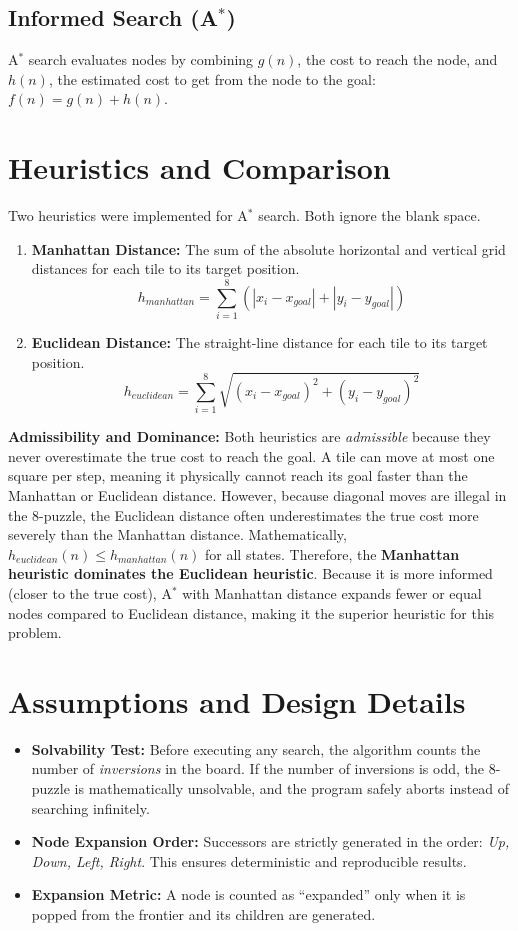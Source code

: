 \documentclass[11pt, a4paper]{article}
\begin{document}
\subsection{Informed Search (A$^*$)}
A$^*$ search evaluates nodes by combining $g(n)$, the cost to reach the node, and $h(n)$, the estimated cost to get from the node to the goal: $f(n) = g(n) + h(n)$.

\section{Heuristics and Comparison}
Two heuristics were implemented for A$^*$ search. Both ignore the blank space.

\begin{enumerate}
    \item \textbf{Manhattan Distance:} The sum of the absolute horizontal and vertical grid distances for each tile to its target position.
    \[ h_{manhattan} = \sum_{i=1}^{8} \left( |x_i - x_{goal}| + |y_i - y_{goal}| \right) \]
    \item \textbf{Euclidean Distance:} The straight-line distance for each tile to its target position.
    \[ h_{euclidean} = \sum_{i=1}^{8} \sqrt{(x_i - x_{goal})^2 + (y_i - y_{goal})^2} \]
\end{enumerate}

\noindent\textbf{Admissibility and Dominance:}
Both heuristics are \textit{admissible} because they never overestimate the true cost to reach the goal. A tile can move at most one square per step, meaning it physically cannot reach its goal faster than the Manhattan or Euclidean distance.
However, because diagonal moves are illegal in the 8-puzzle, the Euclidean distance often underestimates the true cost more severely than the Manhattan distance. Mathematically, $h_{euclidean}(n) \le h_{manhattan}(n)$ for all states. Therefore, the \textbf{Manhattan heuristic dominates the Euclidean heuristic}. Because it is more informed (closer to the true cost), A$^*$ with Manhattan distance expands fewer or equal nodes compared to Euclidean distance, making it the superior heuristic for this problem.

\section{Assumptions and Design Details}
\begin{itemize}
    \item \textbf{Solvability Test:} Before executing any search, the algorithm counts the number of \textit{inversions} in the board. If the number of inversions is odd, the 8-puzzle is mathematically unsolvable, and the program safely aborts instead of searching infinitely.
    \item \textbf{Node Expansion Order:} Successors are strictly generated in the order: \textit{Up, Down, Left, Right}. This ensures deterministic and reproducible results.
    \item \textbf{Expansion Metric:} A node is counted as ``expanded'' only when it is popped from the frontier and its children are generated.
\end{itemize}
\end{document}
